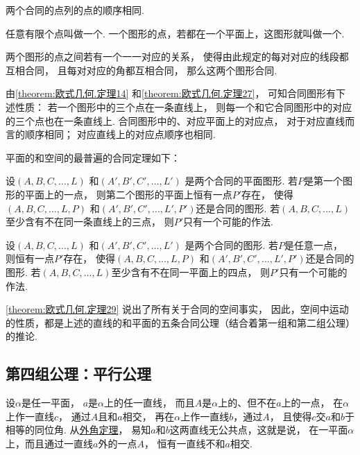 \begin{theorem}\label{theorem:欧式几何.定理27}
两个合同的点列的点的顺序相同.
\end{theorem}

\begin{definition}
任意有限个点叫做一个.
一个图形的点，若都在一个平面上，这图形就叫做一个.
\end{definition}

两个图形的点之间若有一个一一对应的关系，
使得由此规定的每对对应的线段都互相合同，
且每对对应的角都互相合同，
那么这两个图形合同.

由\cref{theorem:欧式几何.定理14}
和\cref{theorem:欧式几何.定理27}，
可知合同图形有下述性质：
若一个图形中的三个点在一条直线上，
则每一个和它合同图形中的对应的三个点也在一条直线上.
合同图形中的、对应平面上的对应点，
对于对应直线而言的顺序相同；
对应直线上的对应点顺序也相同.

平面的和空间的最普遍的合同定理如下：
\begin{theorem}\label{theorem:欧式几何.定理28}
设\((A,B,C,\dotsc,L)\)
和\((A',B',C',\dotsc,L')\)
是两个合同的平面图形.
若\(P\)是第一个图形的平面上的一点，
则第二个图形的平面上恒有一点\(P'\)存在，
使得\((A,B,C,\dotsc,L,P)\)
和\((A',B',C',\dotsc,L',P')\)还是合同的图形.
若\((A,B,C,\dotsc,L)\)至少含有不在同一条直线上的三点，
则\(P'\)只有一个可能的作法.
\end{theorem}

\begin{theorem}\label{theorem:欧式几何.定理29}
设\((A,B,C,\dotsc,L)\)
和\((A',B',C',\dotsc,L')\)
是两个合同的图形.
若\(P\)是任意一点，
则恒有一点\(P'\)存在，
使得\((A,B,C,\dotsc,L,P)\)
和\((A',B',C',\dotsc,L',P')\)还是合同的图形.
若\((A,B,C,\dotsc,L)\)至少含有不在同一平面上的四点，
则\(P'\)只有一个可能的作法.
\end{theorem}

\cref{theorem:欧式几何.定理29} 说出了所有关于合同的空间事实，
因此，空间中运动的性质，都是上述的直线的和平面的五条合同公理（结合着第一组和第二组公理）的推论.

\subsection{第四组公理：平行公理}
设\(\alpha\)是任一平面，
\(a\)是\(\alpha\)上的任一直线，
而且\(A\)是\(\alpha\)上的、但不在\(a\)上的一点，
在\(\alpha\)上作一直线\(c\)，
通过\(A\)且和\(a\)相交，
再在\(\alpha\)上作一直线\(b\)，通过\(A\)，
且使得\(c\)交\(a\)和\(b\)于相等的同位角.
从\hyperref[theorem:欧式几何.定理22]{外角定理}，
易知\(a\)和\(b\)这两直线无公共点，这就是说，
在一平面\(\alpha\)上，而且通过一直线\(a\)外的一点\(A\)，
恒有一直线不和\(a\)相交.

